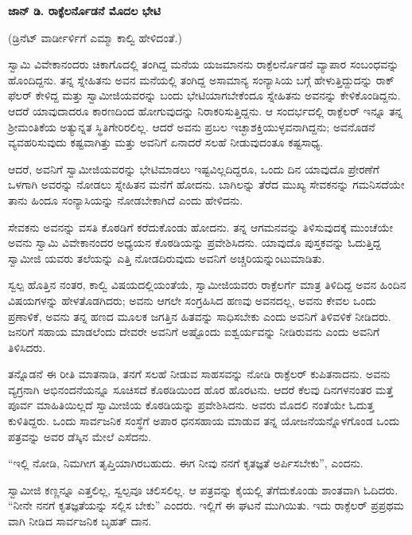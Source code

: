 \begin{center}
\textbf{ಜಾನ್ ಡಿ. ರಾಕ್ಫೆಲರ್ನೊಡನೆ ಮೊದಲ ಭೇಟಿ}
\end{center}

\begin{center}
(ಡ್ರಿನೆಟ್ ವಾರ್ಡೀರ್ಳಿಗೆ ಎಮ್ಮಾ ಕಾಲ್ವಿ ಹೇಳಿದಂತೆ.)
\end{center}

ಸ್ವಾಮಿ ವಿವೇಕಾನಂದರು ಚಿಕಾಗೊದಲ್ಲಿ ತಂಗಿದ್ದ ಮನೆಯ ಯಜಮಾನನು ರಾಕ್ಫೆಲರ್ನೊಡನೆ ವ್ಯಾಪಾರ ಸಂಬಂಧವನ್ನು ಹೊಂದಿದ್ದನು. ತನ್ನ ಸ್ನೇಹಿತನು ಅವನ ಮನೆಯಲ್ಲಿ ತಂಗಿದ್ದ ಅಸಾಮಾನ್ಯ ಸಂನ್ಯಾಸಿಯ ಬಗ್ಗೆ ಹೇಳುತ್ತಿದ್ದುದನ್ನು ರಾಕ್ ಫೆಲರ್ ಕೇಳಿದ್ದ ಮತ್ತು ಸ್ವಾಮೀಜಿಯವರನ್ನು ಬಂದು ಭೇಟಿಯಾಗಬೇಕೆಂದೂ ಸ್ನೇಹಿತನು ಅವನನ್ನು ಕೇಳಿಕೊಂಡಿದ್ದನು. ಆದರೆ ಯಾವುದಾದರೂ ಕಾರಣದಿಂದ ಹೋಗುವುದನ್ನು ನಿರಾಕರಿಸುತ್ತಿದ್ದನು. ಆ ಸಂದರ್ಭದಲ್ಲಿ ರಾಕ್ಫೆಲರ್ ಇನ್ನೂ ತನ್ನ ಶ‍್ರೀಮಂತಿಕೆಯ ಅತ್ಯುನ್ನತ ಸ್ಥಿತಿಗೇರಿರಲಿಲ್ಲ. ಆದರೆ ಅವನು ಪ್ರಬಲ ಇಚ್ಛಾಶಕ್ತಿಯುಳ್ಳವನಾಗಿದ್ದನು; ಅವನೊಡನೆ ವ್ಯವಹರಿಸುವುದು ಕಷ್ಟವಾಗಿತ್ತು ಮತ್ತು ಅವನಿಗೆ ಏನಾದರೆ ಸಲಹೆ ನೀಡುವುದಂತೂ ಕಷ್ಟಸಾಧ್ಯ.

ಆದರೆ, ಅವನಿಗೆ ಸ್ವಾಮೀಜಿಯವರನ್ನು ಭೇಟಿಮಾಡಲು ಇಷ್ಟವಿಲ್ಲದಿದ್ದರೂ, ಒಂದು ದಿನ ಯಾವುದೊ ಪ್ರೇರಣೆಗೆ ಒಳಗಾಗಿ ಅವರನ್ನು ನೋಡಲು ಸ್ನೇಹಿತನ ಮನೆಗೆ ಹೋದನು. ಬಾಗಿಲನ್ನು ತೆರೆದ ಮುಖ್ಯ ಸೇವಕನನ್ನು ಗಮನಿಸದೆಯೇ ತಾನು ಹಿಂದೂ ಸಂನ್ಯಾಸಿಯನ್ನು ನೋಡಬೇಕಾಗಿದೆ ಎಂದು ಹೇಳಿದನು.

ಸೇವಕನು ಅವನನ್ನು ವಸತಿ ಕೊಠಡಿಗೆ ಕರೆದುಕೊಂಡು ಹೋದನು. ತನ್ನ ಆಗಮನವನ್ನು ತಿಳಿಸುವುದಕ್ಕೆ ಮುಂಚೆಯೇ ಅವನು ಸ್ವಾಮಿ ವಿವೇಕಾನಂದರ ಅಧ್ಯಯನ ಕೊಠಡಿಯನ್ನು ಪ್ರವೇಶಿಸಿದನು. ಯಾವುದೊ ಪುಸ್ತಕವನ್ನು ಓದುತ್ತಿದ್ದ ಸ್ವಾಮೀಜಿ ಯವರು ತಲೆಯನ್ನು ಎತ್ತಿ ನೋಡದಿರುವುದು ಅವನಿಗೆ ಅಚ್ಚರಿಯನ್ನುಂಟುಮಾಡಿತು.

ಸ್ವಲ್ಪ ಹೊತ್ತಿನ ನಂತರ, ಕಾಲ್ವಿ ವಿಷಯದಲ್ಲಿಯಂತೆಯೆ, ಸ್ವಾಮೀಜಿಯವರು ರಾಕ್ಫೆಲರ್ಗೆ ಮಾತ್ರ ತಿಳಿದಿದ್ದ ಅವನ ಹಿಂದಿನ ವಿಷಯಗಳನ್ನು ಹೇಳತೊಡಗಿದರು; ಅವನು ಆಗಲೇ ಸಂಗ್ರಹಿಸಿದ ಹಣವು ಅವನದಲ್ಲ, ಅವನು ಕೇವಲ ಒಂದು ಪ್ರಣಾಳಿಕೆ, ಅವನು ತನ್ನ ಹಣದ ಮೂಲಕ ಜಗತ್ತಿನ ಹಿತವನ್ನು ಸಾಧಿಸಬೇಕು ಎಂದು ಅವನಿಗೆ ತಿಳಿವಳಿಕೆ ನೀಡಿದರು. ಜನರಿಗೆ ಸಹಾಯ ಮಾಡಲೆಂದು ದೇವರೇ ಅವನಿಗೆ ಅಷ್ಟೊಂದು ಐಶ್ವರ್ಯವನ್ನು ನೀಡಿರುವನು ಎಂದು ಅವನಿಗೆ ತಿಳಿಸಿದರು.

ತನ್ನೊಡನೆ ಈ ರೀತಿ ಮಾತನಾಡಿ, ತನಗೆ ಸಲಹೆ ನೀಡುವ ಸಾಹಸವನ್ನು ನೋಡಿ ರಾಕ್ಫೆಲರ್ ಕುಪಿತನಾದನು. ಅವನು ವ್ಯಗ್ರನಾಗಿ ಅಭಿನಂದನೆಯನ್ನೂ ಸೂಚಿಸದೆ ಕೊಠಡಿಯಿಂದ ಹೊರ ಹೊರಟನು. ಆದರೆ ಕೆಲವು ದಿನಗಳನಂತರ ಮತ್ತೆ ಪೂರ್ವ ಮಾಹಿತಿಯಿಲ್ಲದೆ ಸ್ವಾಮೀಜಿಯ ಕೊಠಡಿಯನ್ನು ಪ್ರವೇಶಿಸಿದನು. ಅವರು ಮೊದಲಿ ನಂತೆಯೇ ಓದುತ್ತ ಕುಳಿತಿದ್ದರು. ಒಂದು ಸಾರ್ವಜನಿಕ ಸಂಸ್ಥೆಗೆ ಅಪಾರ ಧನಸಹಾಯ ಮಾಡುವ ತನ್ನ ಯೋಜನೆಯನ್ನೊಳಗೊಂಡ ಒಂದು ಪತ್ರವನ್ನು ಅವರ ಡೆಸ್ಕಿನ ಮೇಲೆ ಎಸೆದನು.

“ಇಲ್ಲಿ ನೋಡಿ, ನಿಮಗೀಗ ತೃಪ್ತಿಯಾಗಿರಬಹುದು. ಈಗ ನೀವು ನನಗೆ ಕೃತಜ್ಞತೆ ಅರ್ಪಿಸಬೇಕು”, ಎಂದನು.

ಸ್ವಾಮೀಜಿ ಕಣ್ಣನ್ನೂ ಎತ್ತಲಿಲ್ಲ, ಸ್ವಲ್ಪವೂ ಚಲಿಸಲಿಲ್ಲ. ಆ ಪತ್ರವನ್ನು ಕೈಯಲ್ಲಿ ತೆಗೆದುಕೊಂಡು ಶಾಂತವಾಗಿ ಓದಿದರು. “ನೀನೇ ನನಗೆ ಕೃತಜ್ಞತೆಯನ್ನು ಸಲ್ಲಿಸ ಬೇಕು” ಎಂದರು. ಇಲ್ಲಿಗೆ ಈ ಘಟನೆ ಮುಗಿಯಿತು. ಇದು ರಾಕ್ಫೆಲರ್ ಪ್ರಪ್ರಥಮ ವಾಗಿ ನೀಡಿದ ಸಾರ್ವಜನಿಕ ಬೃಹತ್ ದಾನ.

